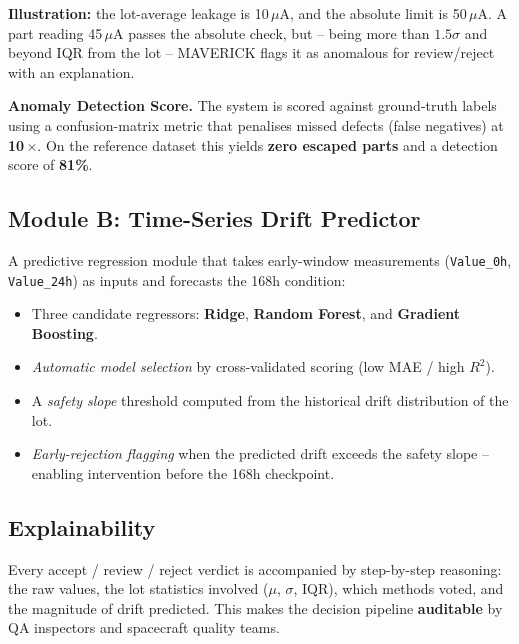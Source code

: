 \documentclass[11pt,a4paper]{article}
\begin{document}
\begin{infobox}
  \textbf{Illustration:} the lot-average leakage is 10\,$\mu$A, and the absolute limit is
  50\,$\mu$A. A part reading 45\,$\mu$A passes the absolute check, but -- being more than
  $1.5\sigma$ and beyond IQR from the lot -- MAVERICK flags it as anomalous for review/reject
  with an explanation.
\end{infobox}

\textbf{Anomaly Detection Score.} The system is scored against ground-truth labels using a
confusion-matrix metric that penalises missed defects (false negatives) at \textbf{10\,$\times$}.
On the reference dataset this yields \textbf{zero escaped parts} and a detection score of
\textbf{81\%}.

\subsection{Module B: Time-Series Drift Predictor}
\label{sec:modB}

A predictive regression module that takes early-window measurements
(\texttt{Value\_0h}, \texttt{Value\_24h}) as inputs and forecasts the 168h condition:

\begin{itemize}[leftmargin=1.5em]
  \item Three candidate regressors: \textbf{Ridge}, \textbf{Random Forest}, and
        \textbf{Gradient Boosting}.
  \item \emph{Automatic model selection} by cross-validated scoring (low MAE / high $R^2$).
  \item A \emph{safety slope} threshold computed from the historical drift distribution of the lot.
  \item \emph{Early-rejection flagging} when the predicted drift exceeds the safety slope --
        enabling intervention before the 168h checkpoint.
\end{itemize}

\subsection{Explainability}
\label{sec:explain}

Every accept / review / reject verdict is accompanied by step-by-step reasoning: the raw values,
the lot statistics involved ($\mu$, $\sigma$, IQR), which methods voted, and the magnitude of
drift predicted. This makes the decision pipeline \textbf{auditable} by QA inspectors and
spacecraft quality teams.
\end{document}
